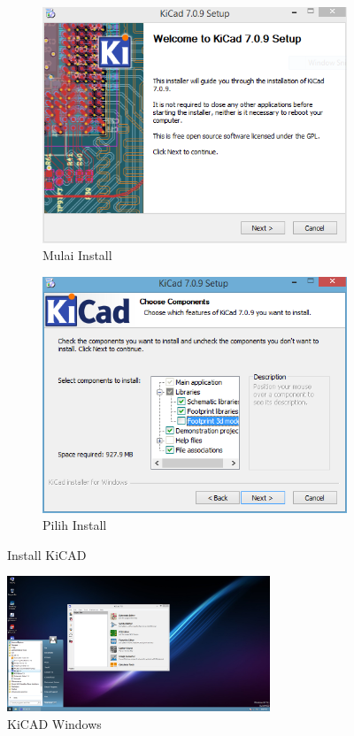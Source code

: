 \documentclass[12pt]{book}
\begin{document}
	\begin{figure}[!ht]
		\centering
		\begin{subfigure}[t]{0.45\textwidth}
			\includegraphics[width=\textwidth]{images/kicad/kicadwin0}
			\caption{Mulai Install}
		\end{subfigure}
		\begin{subfigure}[t]{0.45\textwidth}
			\includegraphics[width=\textwidth]{images/kicad/kicadwin1}
			\caption{Pilih Install}
		\end{subfigure}
		\caption{Install KiCAD}
	\end{figure}
	
	\begin{figure}[!ht]
		\centering
		\includegraphics[width=0.7\textwidth]{images/kicad/kicadwin2}
		\caption{KiCAD Windows}
	\end{figure}
	
\end{document}

